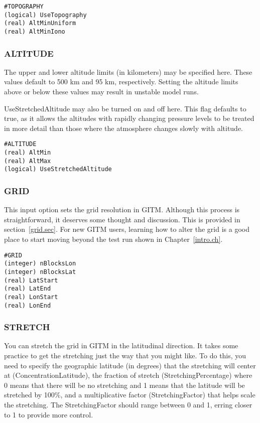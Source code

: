 \begin{verbatim}
#TOPOGRAPHY
(logical) UseTopography
(real) AltMinUniform
(real) AltMinIono
\end{verbatim}

\subsubsection{ALTITUDE}
\label{altitude.sec}

The upper and lower altitude limits (in kilometers) may be specified here.  These values default to 500 km and 95 km, respectively.  Setting the altitude limits above or below these values may result in unstable model runs.

UseStretchedAltitude may also be turned on and off here.  This flag defaults to true, as it allows the altitudes with rapidly changing pressure levels to be treated in more detail than those where the atmosphere changes slowly with altitude.

\begin{verbatim}
#ALTITUDE
(real) AltMin            
(real) AltMax             
(logical) UseStretchedAltitude
\end{verbatim}

\subsubsection{GRID}
\label{input_grid.sec}

This input option sets the grid resolution in GITM.  Although this process is straightforward, it deserves some thought and discussion.  This is provided in section~\ref{grid.sec}.  For new GITM users, learning how to alter the grid is a good place to start moving beyond the test run shown in Chapter~\ref{intro.ch}.

\begin{verbatim}
#GRID
(integer) nBlocksLon  
(integer) nBlocksLat  
(real) LatStart   
(real) LatEnd     
(real) LonStart   
(real) LonEnd     
\end{verbatim}

\subsubsection{STRETCH}

You can stretch the grid in GITM in the latitudinal direction.  It takes some practice to get the stretching just the way that you might like.  To do this, you need to specify the geographic latitude (in degrees) that the stretching will center at (ConcentrationLatitude), the fraction of stretch (StretchingPercentage) where 0 means that there will be no stretching and 1 means that the latitude will be stretched by 100\%, and a multiplicative factor (StretchingFactor) that helps scale the stretching.  The StretchingFactor should range between 0 and 1, erring closer to 1 to provide more control.

